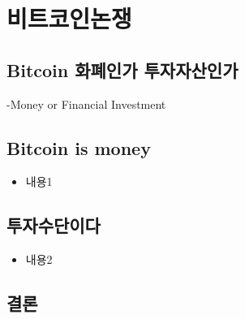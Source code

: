 \documentclass[
]{book}
\providecommand{\tightlist}{%
  \setlength{\itemsep}{0pt}\setlength{\parskip}{0pt}}
\begin{document}
\hypertarget{cross}{%
\chapter{비트코인논쟁}\label{cross}}

\hypertarget{bitcoin-uxd654uxd3d0uxc778uxac00-uxd22cuxc790uxc790uxc0b0uxc778uxac00}{%
\section{Bitcoin 화폐인가 투자자산인가}\label{bitcoin-uxd654uxd3d0uxc778uxac00-uxd22cuxc790uxc790uxc0b0uxc778uxac00}}

-Money or Financial Investment

\hypertarget{bitcoin-is-money}{%
\section{Bitcoin is money}\label{bitcoin-is-money}}

\begin{itemize}
\tightlist
\item
  내용1
\end{itemize}

\hypertarget{uxd22cuxc790uxc218uxb2e8uxc774uxb2e4}{%
\section{투자수단이다}\label{uxd22cuxc790uxc218uxb2e8uxc774uxb2e4}}

\begin{itemize}
\tightlist
\item
  내용2
\end{itemize}

\hypertarget{uxacb0uxb860}{%
\section{결론}\label{uxacb0uxb860}}
\end{document}
